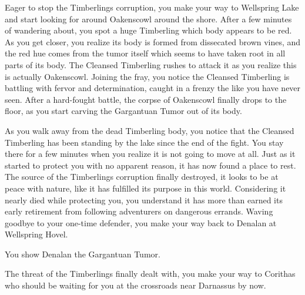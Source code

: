 Eager to stop the Timberlings corruption, you make your way to Wellspring Lake and start looking for around Oakenscowl around the shore. After a few minutes of wandering about, you spot a huge Timberling which body appears to be red. As you get closer, you realize its body is formed from dissecated brown vines, and the red hue comes from the tumor itself which seems to have taken root in all parts of its body. The Cleansed Timberling rushes to attack it as you realize this is actually Oakenscowl. Joining the fray, you notice the Cleansed Timberling is battling with fervor and determination, caught in a frenzy the like you have never seen. After a hard-fought battle, the corpse of Oakenscowl finally drops to the floor, as you start carving the Gargantuan Tumor out of its body.

As you walk away from the dead Timberling body, you notice that the Cleansed Timberling has been standing by the lake since the end of the fight. You stay there for a few minutes when you realize it is not going to move at all. Just as it started to protect you with no apparent reason, it has now found a place to rest. The source of the Timberlings corruption finally destroyed, it looks to be at peace with nature, like it has fulfilled its purpose in this world. Considering it nearly died while protecting you, you understand it has more than earned its early retirement from following adventurers on dangerous errands. Waving goodbye to your one-time defender, you make your way back to Denalan at Wellspring Hovel.


You show Denalan the Gargantuan Tumor.


The threat of the Timberlings finally dealt with, you make your way to Corithas who should be waiting for you at the crossroads near Darnassus by now.
